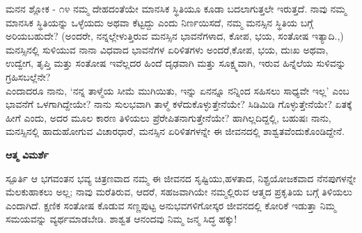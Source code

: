\begin{mananam}{\mananamfont \large ಮನನ ಶ್ಲೋಕ - ೧೪}
\footnotesize \mananamtext ನಮ್ಮ ದೇಹದಂತೆಯೇ ಮಾನಸಿಕ ಸ್ಥಿತಿಯೂ ಕೂಡಾ ಬದಲಾಗುತ್ತಲೇ ಇರುತ್ತದೆ. ನಾವು ನಮ್ಮ ಮಾನಸಿಕ ಸ್ಥಿತಿಯನ್ನು ಒಳ್ಳೆಯದು ಅಥವಾ ಕೆಟ್ಟದ್ದು ಎಂದು ನಿರ್ಣಯಿಸದೆ, ನಮ್ಮ ಮನಸ್ಸಿನ ಸ್ಥಿತಿಯ ಬಗ್ಗೆ ಅರಿಯಬಹುದೇ? (ಅಂದರೇ, ನನ್ನಲ್ಲೇಳುತ್ತಿರುವ ಮನಸ್ಸಿನ ಭಾವನೆಗಳಾದ, ಕೋಪ,  ಭಯ, ಸಂತೋಷ ಇತ್ಯಾದಿ.,) ಮನಸ್ಸಿನಲ್ಲಿ ಸುಳಿಯುವ ನಾನಾ ವಿಧವಾದ ಭಾವನೆಗಳ ಏರಿಳಿತಗಳು ಅಂದರೆ,ಕೋಪ, ಭಯ, ದುಃಖ ಅಥವಾ, ಉದ್ವೇಗ, ತೃಪ್ತಿ ಮತ್ತು ಸಂತೋಷ ಇವೆಲ್ಲದರ ಹಿಂದೆ ದೃಢವಾಗಿ ಮತ್ತು ಸೂಕ್ಷ್ಮವಾಗಿ, ಇರುವ ಹಿನ್ನೆಲೆಯ ಸುಳಿವನ್ನು ಗ್ರಹಿಸಬಲ್ಲೆನೇ?\\
ಎಂದಾದರೂ ನಾನು, ‘ನನ್ನ ತಾಳ್ಮೆಯ ಸೀಮೆ ಮುಗಿಯಿತು, ಇನ್ನು ಏನನ್ನೂ ನನ್ನಿಂದ ಸಹಿಸಲು ಸಾಧ್ಯವೇ ಇಲ್ಲ’ ಎಂಬ ಭಾವನೆಗೆ ಒಳಗಾಗಿದ್ದೇಯೇ? ನಾನು ಸುಲಭವಾಗಿ ತಾಳ್ಮೆ ಕಳೆದುಕೊಳ್ಳುತ್ತೇನೆಯೇ? ಸಿಡಿಮಿಡಿ ಗೊಳ್ಳುತ್ತೇನೆಯೇ? ಏತಕ್ಕೆ ಹೀಗೆ ಎಂದು, ಅದರ ಮೂಲ ಕಾರಣ ತಿಳಿಯಲು ಪ್ರೆರೇಪಿತನಾಗುತ್ತೇನೆಯೇ? ಹಾಗಿಲ್ಲದಿದ್ದಲ್ಲಿ,  ಬಹುಷಃ ನಾನು,  ಮನಸ್ಸಿನಲ್ಲಿ ಹಾದುಹೋಗುವ ವಿಚಾರಧಾರೆ, ಮನಸ್ಸಿನ ಏರಿಳಿತಗಳನ್ನೇ ಈ ಜೀವನದಲ್ಲಿ ಶಾಶ್ವತವೆಂದುಕೊಂಡಿದ್ದೇನೆ. 
\end{mananam}
\WritingHand\enspace\textbf{ಆತ್ಮ ವಿಮರ್ಶೆ}
\begin{inspiration}{\mananamfont \large ಸ್ಪೂರ್ತಿ}
\footnotesize \mananamtext ಆ ಭಗವಂತನ ಭವ್ಯ ಚಿತ್ರಣವಾದ ನಮ್ಮ ಈ ಜೀವನದ ಸೃಷ್ಟಿಯು,ಹಳತಾದ, ನಿಶ್ಪ್ರಯೋಜಕವಾದ ನೆನಪುಗಳನ್ನೇ ಮೆಲಕುಹಾಕಲು ಅಲ್ಲ; ನಾವು ಮರೆತಿರುವ, ಆದರೆ, ಸಹಜವಾಗಿಯೇ ನಮ್ಮಲ್ಲಿರುವ ಆತ್ಮದ ಪ್ರಕೃತಿಯ ಬಗ್ಗೆ ತಿಳಿಯಲು ಎಂದಾಗಿದೆ. ಕ್ಷಣಿಕ ಸಂತೋಷ ಕೊಡುವ ಸಣ್ಣಪುಟ್ಟ ಅನುಭವಗಳಿಗೋಸ್ಕರ ಜೀವನದಲ್ಲಿ ಕೋರಿಕೆ ಇಡುತ್ತಾ ನಿಮ್ಮ ಸಮಯವನ್ನು ವ್ಯರ್ಥಮಾಡಬೇಡಿ.  ಶಾಶ್ವತ ಆನಂದವು ನಿಮ್ಮ ಜನ್ಮ ಸಿದ್ಧ ಹಕ್ಕು!
\end{inspiration}
\newpage


